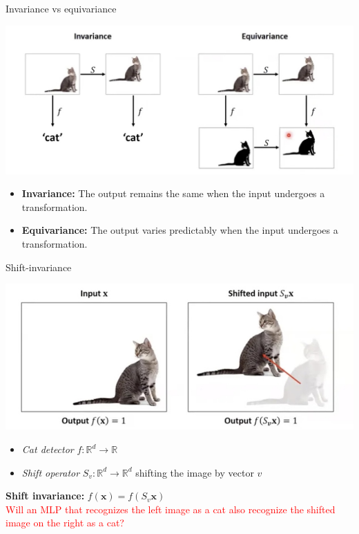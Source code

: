 \documentclass[default, aspectratio=169]{beamer}
\begin{document}
	\begin{frame}{Invariance vs equivariance}
		\begin{center}
			\includegraphics[keepaspectratio, scale=0.28]{pic/invariance_vs_equivariance.jpg}
		\end{center}
		\begin{itemize}
			\item \textbf{Invariance:} The output remains the same when the input undergoes a transformation.
			\item \textbf{Equivariance:} The output varies predictably when the input undergoes a transformation.
			
		\end{itemize}
	\end{frame}
	\begin{frame}{Shift-invariance}
		\begin{center}
			\includegraphics[keepaspectratio, scale=0.25]{pic/shift_invariance.jpg}
		\end{center}
		
		\begin{itemize}
			\item \textit{Cat detector} \quad $f: \mathbb{R}^d \to \mathbb{R}$
			
			\item \textit{Shift operator} \quad $S_v: \mathbb{R}^d \to \mathbb{R}^d$ \quad shifting the image by vector $v$
		\end{itemize}
		
		\textbf{Shift invariance:} \quad $f(\mathbf{x}) = f(S_v \mathbf{x})$ 
		\\ \textcolor{red}{Will an MLP that recognizes the left image as a cat also recognize the shifted image on the right as a cat?}
	\end{frame}
\end{document}
